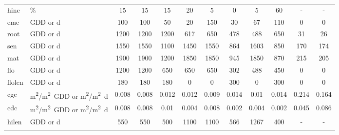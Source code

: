 \begin{footnotesize}
\begin{landscape}
\begin{tabularx}{\linewidth}{lp{2.3cm}cccccccccc}
hinc  & \%    & 15    & 15    & 15    & 20    & 5     & 0     & 5     & 60    & -     & - \\
eme   & \si{GDD} or \si{d} & 100   & 100   & 50    & 20    & 150   & 30    & 67    & 110   & 0     & 0 \\
root  & \si{GDD} or \si{d} & 1200  & 1200  & 1200  & 617   & 650   & 478   & 488   & 650   & 31    & 26 \\
sen   & \si{GDD} or \si{d} & 1550  & 1550  & 1100  & 1450  & 1550  & 864   & 1603  & 850   & 170   & 174 \\
mat   & \si{GDD} or \si{d} & 1900  & 1900  & 1200  & 1850  & 1850  & 945   & 1850  & 870   & 215   & 205 \\
flo   & \si{GDD} or \si{d} & 1200  & 1200  & 650   & 650   & 650   & 302   & 488   & 450   & 0     & 0 \\
flolen & \si{GDD} or \si{d} & 180   & 180   & 180   & 0     & 0     & 300   & 0     & 300   & 0     & 0 \\
cgc   & \si{m^2/m^2.GDD} or \si{m^2/m^2.d} & 0.008 & 0.008 & 0.012 & 0.012 & 0.009 & 0.014 & 0.01  & 0.014 & 0.214 & 0.164 \\
cdc   & \si{m^2/m^2.GDD} or \si{m^2/m^2.d} & 0.008 & 0.008 & 0.01  & 0.004 & 0.008 & 0.002 & 0.004 & 0.002 & 0.045 & 0.086 \\
hilen & \si{GDD} or \si{d} & 550   & 550   & 500   & 1100  & 1100  & 566   & 1267  & 400   & -     & - \\
\bottomrule
  \label{tab:AnB_croppar}%
\end{tabularx}
\end{landscape}



\end{footnotesize}
